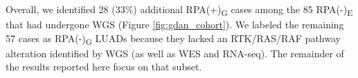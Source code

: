 \documentclass[phd,tocprelim]{cornell}
\renewcommand{\caption}[1]{\singlespacing\hangcaption{#1}\normalspacing}
\begin{document}
Overall, we identified 28 (33\%) additional RPA(+)\textsubscript{G} cases among the 85 RPA(-)\textsubscript{E} that had undergone WGS (Figure \ref{fig:gdan_cohort}). We labeled the remaining 57 cases as RPA(-)\textsubscript{G} LUADs because they lacked an RTK/RAS/RAF pathway alteration identified by WGS (as well as WES and RNA-seq). The remainder of the results reported here focus on that subset.



\clearpage
\begin{figure}[!ht]
\end{figure}
\end{document}
